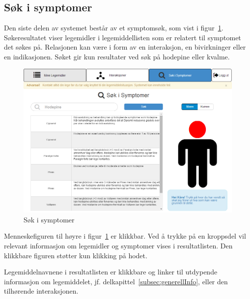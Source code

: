 \subsection{Søk i symptomer}
Den siste delen av systemet består av et symptomsøk, som vist i figur~\ref{fig:sokSymptomer}. 
Søkeresultatet viser legemidler i legemiddellisten som er relatert til symptomet det søkes på. Relasjonen kan være i form av en interaksjon, en bivirkninger eller en indikasjonen. Søket gir kun resultater ved søk på hodepine eller kvalme.  

\begin{figure}[H]
    \centering
    \includegraphics[width=1\textwidth]{fig/utviklingAvPrototype/sokSymptomer.PNG}
    \caption{Søk i symptomer}
    \label{fig:sokSymptomer}
\end{figure} 

Menneskefiguren til høyre i figur~\ref{fig:sokSymptomer} er klikkbar. Ved å trykke på en kroppsdel vil relevant informasjon om legemidler og symptomer vises i resultatlisten. Den klikkbare figuren støtter kun klikking på hodet.

Legemiddelnavnene i resultatlisten er klikkbare og linker til utdypende informasjon om legemiddelet, jf. delkapittel~\ref{subsec:generellInfo}, eller den tilhørende interaksjonen. 